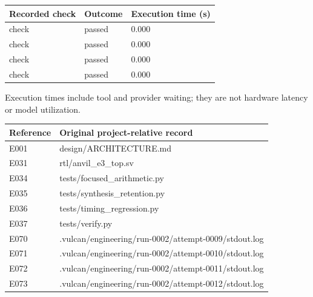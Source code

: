 \documentclass[11pt,a4paper]{article}
\begin{document}
{\small\renewcommand{\arraystretch}{1.18}\begin{longtable}{@{}L{0.57\textwidth}|L{0.16\textwidth}|L{0.17\textwidth}@{}}\toprule

\textbf{Recorded check} & \textbf{Outcome} & \textbf{Execution time (\allowbreak{}s)\allowbreak{}}\\\midrule\endhead

check & passed & 0.000\\[2pt]\hline

check & passed & 0.000\\[2pt]\hline

check & passed & 0.000\\[2pt]\hline

check & passed & 0.000\\[2pt]\hline

\bottomrule\end{longtable}}

Execution times include tool and provider waiting; they are not hardware latency or model utilization.

{\small\renewcommand{\arraystretch}{1.18}\begin{longtable}{@{}L{0.12\textwidth}|L{0.82\textwidth}@{}}\toprule

\textbf{Reference} & \textbf{Original project-relative record}\\\midrule\endhead

E001 & design/\allowbreak{}ARCHITECTURE.md\\[2pt]\hline

E031 & rtl/\allowbreak{}anvil\_\allowbreak{}e3\_\allowbreak{}top.sv\\[2pt]\hline

E034 & tests/\allowbreak{}focused\_\allowbreak{}arithmetic.py\\[2pt]\hline

E035 & tests/\allowbreak{}synthesis\_\allowbreak{}retention.py\\[2pt]\hline

E036 & tests/\allowbreak{}timing\_\allowbreak{}regression.py\\[2pt]\hline

E037 & tests/\allowbreak{}verify.py\\[2pt]\hline

E070 & .vulcan/\allowbreak{}engineering/\allowbreak{}run-0002/\allowbreak{}attempt-0009/\allowbreak{}stdout.log\\[2pt]\hline

E071 & .vulcan/\allowbreak{}engineering/\allowbreak{}run-0002/\allowbreak{}attempt-0010/\allowbreak{}stdout.log\\[2pt]\hline

E072 & .vulcan/\allowbreak{}engineering/\allowbreak{}run-0002/\allowbreak{}attempt-0011/\allowbreak{}stdout.log\\[2pt]\hline

E073 & .vulcan/\allowbreak{}engineering/\allowbreak{}run-0002/\allowbreak{}attempt-0012/\allowbreak{}stdout.log\\[2pt]\hline

\bottomrule\end{longtable}}
\end{document}
